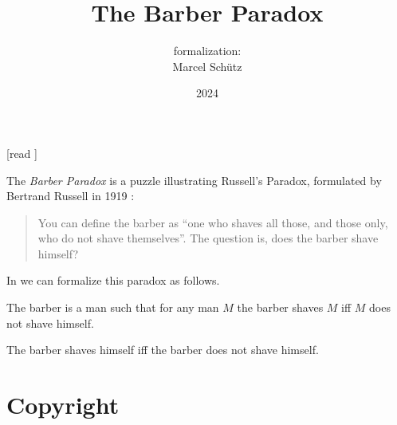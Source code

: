 \documentclass{article}
\title{The Barber Paradox}
\author{\Naproche formalization:\\[0.5em]Marcel Schütz}
\date{2024}
\begin{document}
  \maketitle

  \begin{imports}
    \begin{forthel}
      [read ]
    \end{forthel}
  \end{imports}

  \noindent The \emph{Barber Paradox} is a puzzle illustrating Russell's
  Paradox, formulated by Bertrand Russell in 1919 \cite[p. 355]{Russell1919}:

  \begin{quotation}
    \noindent You can define the barber as ``one who shaves all those, and 
    those only, who do not shave themselves''.
    The question is, does the barber shave himself?
  \end{quotation}
  
  \noindent In \Naproche we can formalize this paradox as follows.

  \begin{forthel}
    \begin{signature*}
      The barber is a man such that for any man $M$ the barber shaves $M$ iff $M$ does not shave himself.
    \end{signature*}
    
    \begin{theorem*}[title=Barber Paradox,id=barber_paradox]
      The barber shaves himself iff the barber does not shave himself.
    \end{theorem*}
  \end{forthel}

  \printbibliography

  \section*{Copyright}
  \doclicenseThis
\end{document}

